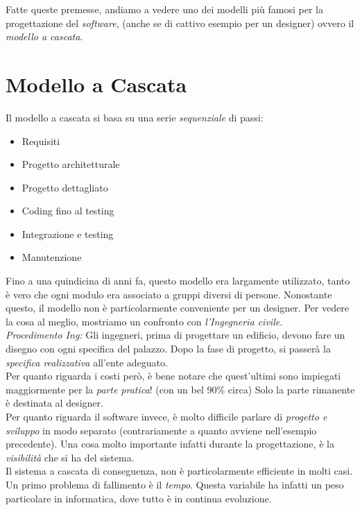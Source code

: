 \documentclass[oneside]{book}
\begin{document}
	Fatte queste premesse, andiamo a vedere uno dei modelli più famosi per la progettazione del \emph{software}, (anche se di cattivo esempio per un designer) ovvero il \emph{modello a cascata}.

	\section{Modello a Cascata} \label{sec:Cascata}
		Il modello a cascata si basa su una serie \emph{sequenziale} di passi:
		\begin{itemize}
		\item Requisiti
		\item Progetto architetturale
		\item Progetto dettagliato
		\item Coding fino al testing
		\item Integrazione e testing
		\item Manutenzione
		\end{itemize}
		Fino a una quindicina di anni fa, questo modello era largamente utilizzato, tanto è vero che ogni modulo era associato a gruppi diversi di persone. Nonostante questo, il modello non è particolarmente conveniente per un designer. Per vedere la cosa al meglio, mostriamo un confronto con \emph{l'Ingegneria civile}. \\

		\emph{Procedimento Ing:} Gli ingegneri, prima di progettare un edificio, devono fare un disegno con ogni specifica del palazzo. Dopo la fase di progetto, si passerà la \emph{specifica realizzativa} all'ente adeguato. \\
		Per quanto riguarda i costi però, è bene notare che quest'ultimi sono impiegati maggiormente per la \emph{parte pratica}! (con un bel 90\% circa) Solo la parte rimanente è destinata al designer. \\

		Per quanto riguarda il software invece, è molto difficile parlare di \emph{progetto e sviluppo} in modo separato (contrariamente a quanto avviene nell'esempio precedente). Una cosa molto importante infatti durante la progettazione, è la \emph{visibilità} che si ha del sistema. \\

		Il sistema a cascata di conseguenza, non è particolarmente efficiente in molti casi. Un primo problema di fallimento è il \emph{tempo}. Questa variabile ha infatti un peso particolare in informatica, dove tutto è in continua evoluzione.
		
\end{document}
